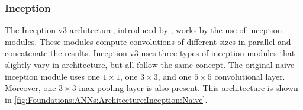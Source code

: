 \subsubsection{Inception}
\label{sec:Foundations:NeuralNetworks:Architecture:Inception}

The Inception v3 architecture, introduced by \textcite{szegedy2016rethinking}, works by the use of inception modules. These modules compute convolutions of different sizes in parallel and concatenate the results. Inception v3 uses three types of inception modules that slightly vary in architecture, but all follow the same concept. The original naive inception module uses one $1 \times 1$, one $3 \times 3$, and one $5 \times 5$ convolutional layer. Moreover, one $3 \times 3$ max-pooling layer is also present. This architecture is shown in \autoref{fig:Foundations:ANNs:Architecture:Inception:Naive}.

